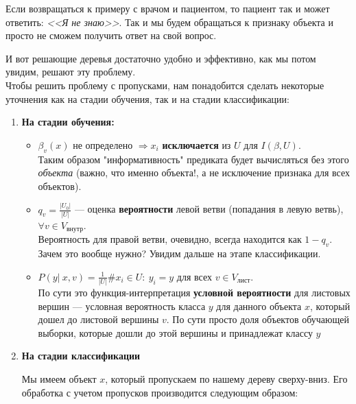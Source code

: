 \documentclass{article}
\begin{document}
Если возвращаться к примеру с врачом и пациентом, то пациент так и может ответить: \textit{<<Я не знаю>>}. Так и мы будем обращаться к признаку объекта и просто не сможем получить ответ на свой вопрос. 

И вот решающие деревья достаточно удобно и эффективно, как мы потом увидим, решают эту проблему.
\\

Чтобы решить проблему с пропусками, нам понадобится сделать некоторые уточнения как на стадии обучения, так и на стадии классификации:

\begin{enumerate}
\item [] \textbf{На стадии обучения:}

	\begin{itemize}
	\item $\beta_v(x)$ не определено $\Rightarrow x_i$ \textbf{исключается} из $U$ для $I(\beta, U)$.
	\\
	
	Таким образом "информативность" предиката будет вычисляться без этого \textit{объекта} (важно, что именно объекта!, а не исключение признака для всех объектов).
	\\
	
	\item $q_v = \frac{|U_0|}{|U|}$ --- оценка \textbf{вероятности} левой ветви (попадания в левую ветвь),
			$\forall v \in V_\text{внутр}$.
	\\
		
	Вероятность для правой ветви, очевидно, всегда находится как $1 - q_v$. Зачем это вообще нужно? Увидим дальше на этапе классификации.
	\\
	
	\item $P(y |\ x, v) = \frac{1}{|U|}\#{x_i \in U:\ y_i = y}$ для всех $v \in V_\text{лист}$.
	\\
		
	По сути это функция-интерпретация \textbf{условной вероятности} для листовых вершин --- условная вероятность класса $y$ для данного объекта $x$, который дошел до листовой вершины $v$. По сути просто доля объектов обучающей выборки, которые дошли до этой вершины и принадлежат классу $y$
	
	\end{itemize}
	
\item [] \textbf{На стадии классификации}

	Мы имеем объект $x$, который пропускаем по нашему дереву сверху-вниз. Его обработка с учетом пропусков производится следующим образом:
	

\end{enumerate}
\end{document}
